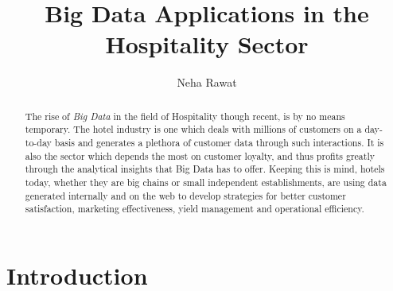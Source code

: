\documentclass[sigconf]{acmart}
\begin{document}
\title{Big Data Applications in the Hospitality Sector}


\author{Neha Rawat}



\renewcommand{\shortauthors}{N. Rawat}


\begin{abstract}
 The rise of {\em Big Data} in the field of Hospitality though recent, is by no means temporary. The hotel industry is one which deals with millions of customers on a day-to-day basis and generates a plethora of customer data through such interactions. It is also the sector which depends the most on customer loyalty, and thus profits greatly through the analytical insights that Big Data has to offer. Keeping this is mind, hotels today, whether they are big chains or small independent establishments, are using data generated internally and on the web to develop strategies for better customer satisfaction, marketing effectiveness, yield management and operational efficiency. 
\end{abstract}


\maketitle

\section{Introduction}
\end{document}
